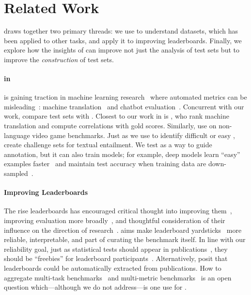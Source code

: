 \section{Related Work}
\label{ch:isicle:rel}

\name{} draws together two primary threads: we use \irt{} to
understand datasets, which has been applied to other  tasks,
and apply it to improving leaderboards.
Finally, we explore how the insights of \irt{} can improve not just
the analysis of test sets but to improve the \emph{construction} of
test sets.

\paragraph{\textbf{ in }}
\irt{} is gaining traction in machine learning
research~\citep{martinez2016ml,martinez2019irt} where automated metrics can be
misleading~\citep{sedoc2019chateval}: machine
translation~\citep{hopkins2013competitions} and chatbot
evaluation~\citep{sedoc2020irt}.
Concurrent with our work, \citet{vania2021compare} compare \nlp{} test sets with \irt{}.
Closest to our work in \nlp{} is \citet{otani2016aggregation}, who
rank machine translation \subjs{} and compute correlations with gold
scores.  Similarly, \citet{martinez2020indicators} use \irt{} on
non-language  video game benchmarks.
Just as we use \irt{} to identify difficult or easy \itms{},
\citet{lalor2016irt} create challenge sets for textual entailment.
We
test \irt{} as a way to guide annotation, but it can also
train \nlp{} models; for example, deep models learn ``easy'' examples
faster~\citep{lalor2018diff} and maintain test accuracy when training
data are down-sampled~\citep{lalor2019latent}.

\paragraph{\textbf{Improving Leaderboards}}
The rise \nlp{} leaderboards has encouraged critical thought into
improving them~\citep{linzen2020progress}, improving evaluation more
broadly~\citep{eger2020workshop}, and thoughtful consideration of
their influence on the direction of
research~\citep{sculley2018curse,dotan2020value}.
\name{} aims make leaderboard
yardsticks~\citep{hernandez2020yardsticks} more reliable,
interpretable, and part of curating the benchmark itself.
In line
with our reliability goal, just as statistical tests should appear in
publications~\citep{dror2018guide,Dodge2019ShowYW}, they should be
``freebies'' for leaderboard
participants~\citep{ethayarajh2020utility}.  Alternatively,
\citet{hou2019leader} posit that leaderboards could be automatically
extracted from publications.
How to aggregate multi-task
benchmarks~\citep{wang2018glue,wang2019superglue,fisch2019mrqa} and multi-metric benchmarks~\citep{ma2021dynaboard} is an
open question which---although we do not address---is one use for
\irt{}.


